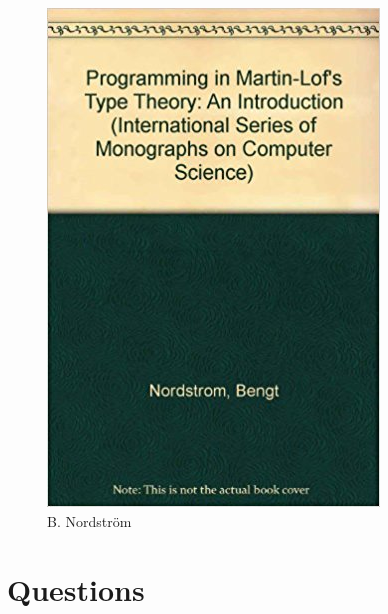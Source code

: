 \documentclass[xetex]{beamer}
\begin{document}
\begin{frame}
\begin{figure}[ht]
\begin{minipage}[b]{0.5\linewidth}
  \end{minipage}%
  \begin{minipage}[b]{0.5\linewidth}
    \centering
    \includegraphics[width=.3\linewidth]{nordstrombook} 
    \caption*{B. Nordstr\"om} 
    \vspace{4ex}
  \end{minipage} 
\end{figure}
\end{frame}

\section{Questions}
\end{document}
